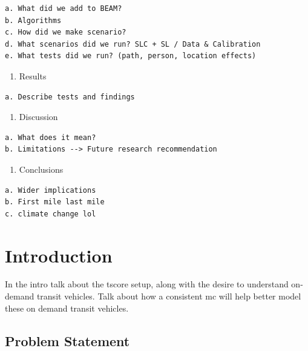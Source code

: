 \documentclass[12pt, oneside, openright]{byuthesis}
\providecommand{\tightlist}{%
  \setlength{\itemsep}{0pt}\setlength{\parskip}{0pt}}
\begin{document}
\begin{verbatim}
a. What did we add to BEAM?
b. Algorithms
c. How did we make scenario?
d. What scenarios did we run? SLC + SL / Data & Calibration
e. What tests did we run? (path, person, location effects)
\end{verbatim}

\begin{enumerate}
\def\labelenumi{\arabic{enumi}.}
\setcounter{enumi}{3}
\tightlist
\item
  Results
\end{enumerate}

\begin{verbatim}
a. Describe tests and findings
\end{verbatim}

\begin{enumerate}
\def\labelenumi{\arabic{enumi}.}
\setcounter{enumi}{4}
\tightlist
\item
  Discussion
\end{enumerate}

\begin{verbatim}
a. What does it mean?
b. Limitations --> Future research recommendation
\end{verbatim}

\begin{enumerate}
\def\labelenumi{\arabic{enumi}.}
\setcounter{enumi}{5}
\tightlist
\item
  Conclusions
\end{enumerate}

\begin{verbatim}
a. Wider implications
b. First mile last mile
c. climate change lol
\end{verbatim}

\hypertarget{introduction}{%
\chapter{Introduction}\label{introduction}}

In the intro talk about the tscore setup, along with the desire to understand on-demand transit vehicles. Talk about how a consistent mc will help better model these on demand transit vehicles.

\hypertarget{problem-statement}{%
\section{Problem Statement}\label{problem-statement}}
\end{document}
